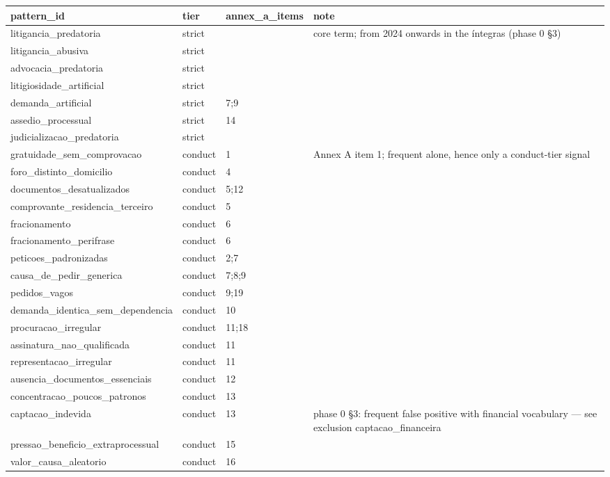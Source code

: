 \begin{table}[htbp]
\centering
\label{tab:lexicon_patterns}
\begin{tabular}{llll}
\toprule
pattern\_id & tier & annex\_a\_items & note \\
\midrule
litigancia\_predatoria & strict &  & core term; from 2024 onwards in the íntegras (phase 0 §3) \\
litigancia\_abusiva & strict &  &  \\
advocacia\_predatoria & strict &  &  \\
litigiosidade\_artificial & strict &  &  \\
demanda\_artificial & strict & 7;9 &  \\
assedio\_processual & strict & 14 &  \\
judicializacao\_predatoria & strict &  &  \\
gratuidade\_sem\_comprovacao & conduct & 1 & Annex A item 1; frequent alone, hence only a conduct-tier signal \\
foro\_distinto\_domicilio & conduct & 4 &  \\
documentos\_desatualizados & conduct & 5;12 &  \\
comprovante\_residencia\_terceiro & conduct & 5 &  \\
fracionamento & conduct & 6 &  \\
fracionamento\_perifrase & conduct & 6 &  \\
peticoes\_padronizadas & conduct & 2;7 &  \\
causa\_de\_pedir\_generica & conduct & 7;8;9 &  \\
pedidos\_vagos & conduct & 9;19 &  \\
demanda\_identica\_sem\_dependencia & conduct & 10 &  \\
procuracao\_irregular & conduct & 11;18 &  \\
assinatura\_nao\_qualificada & conduct & 11 &  \\
representacao\_irregular & conduct & 11 &  \\
ausencia\_documentos\_essenciais & conduct & 12 &  \\
concentracao\_poucos\_patronos & conduct & 13 &  \\
captacao\_indevida & conduct & 13 & phase 0 §3: frequent false positive with financial vocabulary — see exclusion captacao\_financeira \\
pressao\_beneficio\_extraprocessual & conduct & 15 &  \\
valor\_causa\_aleatorio & conduct & 16 &  \\

\end{tabular}
\end{table}
